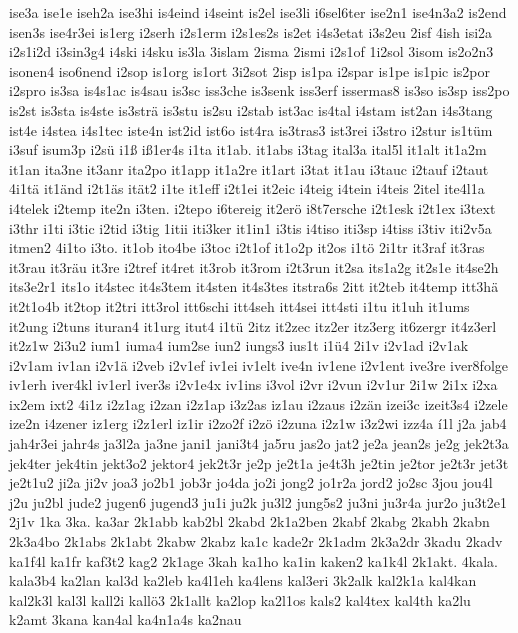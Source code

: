 {ise3a
ise1e
iseh2a
ise3hi
is4eind
i4seint
is2el
ise3li
i6sel6ter
ise2n1
ise4n3a2
is2end
isen3s
ise4r3ei
is1erg
i2serh
i2s1erm
i2s1es2s
is2et
i4s3etat
i3s2eu
2isf
4ish
isi2a
i2s1i2d
i3sin3g4
i4ski
i4sku
is3la
3islam
2isma
2ismi
i2s1of
1i2sol
3isom
is2o2n3
isonen4
iso6nend
i2sop
is1org
is1ort
3i2sot
2isp
is1pa
i2spar
is1pe
is1pic
is2por
i2spro
is3sa
is4s1ac
is4sau
is3sc
iss3che
is3senk
iss3erf
issermas8
is3so
is3sp
iss2po
is2st
is3sta
is4ste
is3strä
is3stu
is2su
i2stab
ist3ac
is4tal
i4stam
ist2an
i4s3tang
ist4e
i4stea
i4s1tec
iste4n
ist2id
ist6o
ist4ra
is3tras3
ist3rei
i3stro
i2stur
is1tüm
i3suf
isum3p
i2sü
i1ß
iß1er4s
i1ta
it1ab.
it1abs
i3tag
ital3a
ital5l
it1alt
it1a2m
it1an
ita3ne
it3anr
ita2po
it1app
it1a2re
it1art
i3tat
it1au
i3tauc
i2tauf
i2taut
4i1tä
it1änd
i2t1äs
ität2
i1te
it1eff
i2t1ei
it2eic
i4teig
i4tein
i4teis
2itel
ite4l1a
i4telek
i2temp
ite2n
i3ten.
i2tepo
i6tereig
it2erö
i8t7ersche
i2t1esk
i2t1ex
i3text
i3thr
i1ti
i3tic
i2tid
i3tig
1itii
iti3ker
it1in1
i3tis
i4tiso
iti3sp
i4tiss
i3tiv
iti2v5a
itmen2
4i1to
i3to.
it1ob
ito4be
i3toc
i2t1of
it1o2p
it2os
i1tö
2i1tr
it3raf
it3ras
it3rau
it3räu
it3re
i2tref
it4ret
it3rob
it3rom
i2t3run
it2sa
its1a2g
it2s1e
it4se2h
its3e2r1
its1o
it4stec
it4s3tem
it4sten
it4s3tes
itstra6s
2itt
it2teb
it4temp
itt3hä
it2t1o4b
it2top
it2tri
itt3rol
itt6schi
itt4seh
itt4sei
itt4sti
i1tu
it1uh
it1ums
it2ung
i2tuns
ituran4
it1urg
itut4
i1tü
2itz
it2zec
itz2er
itz3erg
it6zergr
it4z3erl
it2z1w
2i3u2
ium1
iuma4
ium2se
iun2
iungs3
ius1t
i1ü4
2i1v
i2v1ad
i2v1ak
i2v1am
iv1an
i2v1ä
i2veb
i2v1ef
iv1ei
iv1elt
ive4n
iv1ene
i2v1ent
ive3re
iver8folge
iv1erh
iver4kl
iv1erl
iver3s
i2v1e4x
iv1ins
i3vol
i2vr
i2vun
i2v1ur
2i1w
2i1x
i2xa
ix2em
ixt2
4i1z
i2z1ag
i2zan
i2z1ap
i3z2as
iz1au
i2zaus
i2zän
izei3c
izeit3s4
i2zele
ize2n
i4zener
iz1erg
i2z1erl
iz1ir
i2zo2f
i2zö
i2zuna
i2z1w
i3z2wi
izz4a
í1l
j2a
jab4
jah4r3ei
jahr4s
ja3l2a
ja3ne
jani1
jani3t4
ja5ru
jas2o
jat2
je2a
jean2s
je2g
jek2t3a
jek4ter
jek4tin
jekt3o2
jektor4
jek2t3r
je2p
je2t1a
je4t3h
je2tin
je2tor
je2t3r
jet3t
je2t1u2
ji2a
ji2v
joa3
jo2b1
job3r
jo4da
jo2i
jong2
jo1r2a
jord2
jo2sc
3jou
jou4l
j2u
ju2bl
jude2
jugen6
jugend3
ju1i
ju2k
ju3l2
jung5s2
ju3ni
ju3r4a
jur2o
ju3t2e1
2j1v
1ka
3ka.
ka3ar
2k1abb
kab2bl
2kabd
2k1a2ben
2kabf
2kabg
2kabh
2kabn
2k3a4bo
2k1abs
2k1abt
2kabw
2kabz
ka1c
kade2r
2k1adm
2k3a2dr
3kadu
2kadv
ka1f4l
ka1fr
kaf3t2
kag2
2k1age
3kah
ka1ho
ka1in
kaken2
ka1k4l
2k1akt.
4kala.
kala3b4
ka2lan
kal3d
ka2leb
ka4l1eh
ka4lens
kal3eri
3k2alk
kal2k1a
kal4kan
kal2k3l
kal3l
kall2i
kallö3
2k1allt
ka2lop
ka2l1os
kals2
kal4tex
kal4th
ka2lu
k2amt
3kana
kan4al
ka4n1a4s
ka2nau
}
